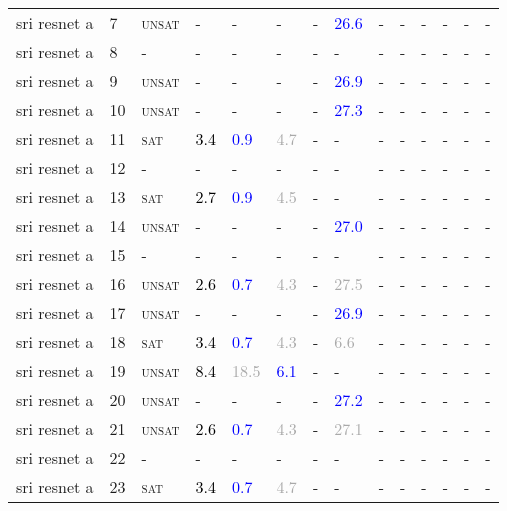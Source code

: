 \begin{center}
{\begin{longtable}{@{}llllllllllllll@{}}
sri resnet a & 7 & \textsc{unsat} & - & - & - & - & \textcolor{blue}{26.6} & - & - & - & - & - & - \\
sri resnet a & 8 & - & - & - & - & - & - & - & - & - & - & - & - \\
sri resnet a & 9 & \textsc{unsat} & - & - & - & - & \textcolor{blue}{26.9} & - & - & - & - & - & - \\
sri resnet a & 10 & \textsc{unsat} & - & - & - & - & \textcolor{blue}{27.3} & - & - & - & - & - & - \\
sri resnet a & 11 & \textsc{sat} & \textcolor{black}{3.4} & \textcolor{blue}{0.9} & \textcolor{darkgray}{4.7} & - & - & - & - & - & - & - & - \\
sri resnet a & 12 & - & - & - & - & - & - & - & - & - & - & - & - \\
sri resnet a & 13 & \textsc{sat} & \textcolor{black}{2.7} & \textcolor{blue}{0.9} & \textcolor{darkgray}{4.5} & - & - & - & - & - & - & - & - \\
sri resnet a & 14 & \textsc{unsat} & - & - & - & - & \textcolor{blue}{27.0} & - & - & - & - & - & - \\
sri resnet a & 15 & - & - & - & - & - & - & - & - & - & - & - & - \\
sri resnet a & 16 & \textsc{unsat} & \textcolor{black}{2.6} & \textcolor{blue}{0.7} & \textcolor{darkgray}{4.3} & - & \textcolor{darkgray}{27.5} & - & - & - & - & - & - \\
sri resnet a & 17 & \textsc{unsat} & - & - & - & - & \textcolor{blue}{26.9} & - & - & - & - & - & - \\
sri resnet a & 18 & \textsc{sat} & \textcolor{black}{3.4} & \textcolor{blue}{0.7} & \textcolor{darkgray}{4.3} & - & \textcolor{darkgray}{6.6} & - & - & - & - & - & - \\
sri resnet a & 19 & \textsc{unsat} & \textcolor{black}{8.4} & \textcolor{darkgray}{18.5} & \textcolor{blue}{6.1} & - & - & - & - & - & - & - & - \\
sri resnet a & 20 & \textsc{unsat} & - & - & - & - & \textcolor{blue}{27.2} & - & - & - & - & - & - \\
sri resnet a & 21 & \textsc{unsat} & \textcolor{black}{2.6} & \textcolor{blue}{0.7} & \textcolor{darkgray}{4.3} & - & \textcolor{darkgray}{27.1} & - & - & - & - & - & - \\
sri resnet a & 22 & - & - & - & - & - & - & - & - & - & - & - & - \\
sri resnet a & 23 & \textsc{sat} & \textcolor{black}{3.4} & \textcolor{blue}{0.7} & \textcolor{darkgray}{4.7} & - & - & - & - & - & - & - & - \\

\end{longtable}}
\end{center}
